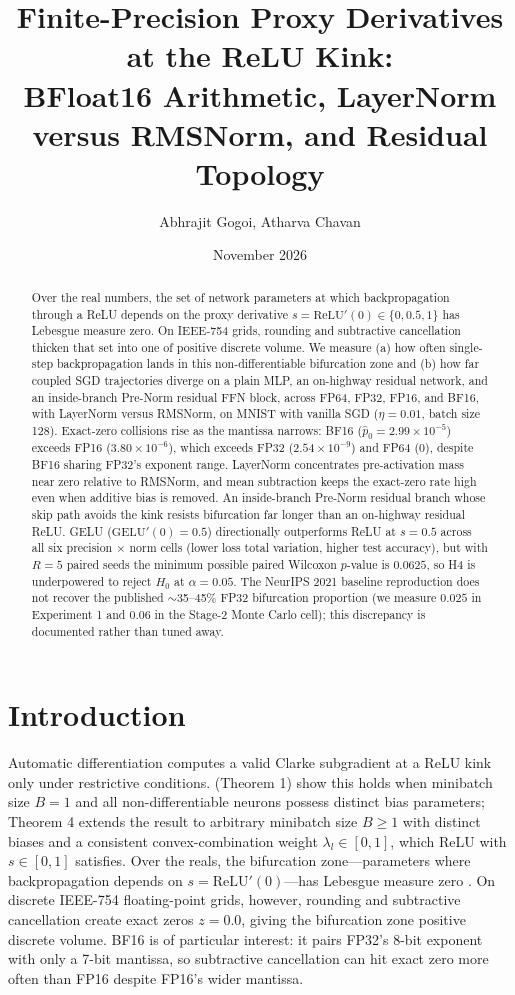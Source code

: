 \documentclass[11pt]{article}
\title{Finite-Precision Proxy Derivatives at the ReLU Kink:\\
       BFloat16 Arithmetic, LayerNorm versus RMSNorm, and Residual Topology}
\author{Abhrajit Gogoi, Atharva Chavan}
\date{November 2026}
\begin{document}
\maketitle

\begin{abstract}
\noindent Over the real numbers, the set of network parameters at which backpropagation through a ReLU depends on the proxy derivative $s=\mathrm{ReLU}'(0)\in\{0,0.5,1\}$ has Lebesgue measure zero. On IEEE-754 grids, rounding and subtractive cancellation thicken that set into one of positive discrete volume. We measure (a) how often single-step backpropagation lands in this non-differentiable bifurcation zone and (b) how far coupled SGD trajectories diverge on a plain MLP, an on-highway residual network, and an inside-branch Pre-Norm residual FFN block, across FP64, FP32, FP16, and BF16, with LayerNorm versus RMSNorm, on MNIST with vanilla SGD ($\eta=0.01$, batch size 128). Exact-zero collisions rise as the mantissa narrows: BF16 ($\hat p_0=2.99\times10^{-5}$) exceeds FP16 ($3.80\times10^{-6}$), which exceeds FP32 ($2.54\times10^{-9}$) and FP64 ($0$), despite BF16 sharing FP32's exponent range. LayerNorm concentrates pre-activation mass near zero relative to RMSNorm, and mean subtraction keeps the exact-zero rate high even when additive bias is removed. An inside-branch Pre-Norm residual branch whose skip path avoids the kink resists bifurcation far longer than an on-highway residual ReLU. GELU ($\mathrm{GELU}'(0)=0.5$) directionally outperforms ReLU at $s=0.5$ across all six precision $\times$ norm cells (lower loss total variation, higher test accuracy), but with $R=5$ paired seeds the minimum possible paired Wilcoxon $p$-value is $0.0625$, so H4 is underpowered to reject $H_0$ at $\alpha=0.05$. The NeurIPS 2021 baseline reproduction does not recover the published $\sim$35--45\% FP32 bifurcation proportion (we measure $0.025$ in Experiment 1 and $0.06$ in the Stage-2 Monte Carlo cell); this discrepancy is documented rather than tuned away.
\end{abstract}

\section{Introduction}\label{sec:introduction}
Automatic differentiation computes a valid Clarke subgradient at a ReLU kink only under restrictive conditions. \citet{park2024whatadcomputes} (Theorem 1) show this holds when minibatch size $B=1$ and all non-differentiable neurons possess distinct bias parameters; Theorem 4 extends the result to arbitrary minibatch size $B\ge 1$ with distinct biases and a consistent convex-combination weight $\lambda_l\in[0,1]$, which ReLU with $s\in[0,1]$ satisfies. Over the reals, the bifurcation zone---parameters where backpropagation depends on $s=\mathrm{ReLU}'(0)$---has Lebesgue measure zero \citep{bertoin2021relu,bolte2021conservative}. On discrete IEEE-754 floating-point grids, however, rounding and subtractive cancellation create exact zeros $z=\mathtt{0.0}$, giving the bifurcation zone positive discrete volume. BF16 is of particular interest: it pairs FP32's 8-bit exponent with only a 7-bit mantissa, so subtractive cancellation can hit exact zero more often than FP16 despite FP16's wider mantissa.
\end{document}
